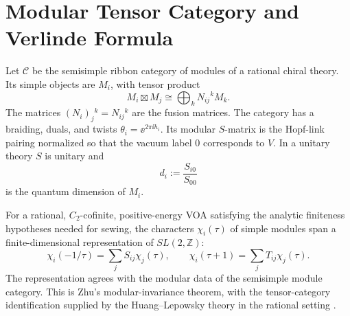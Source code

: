 \section{Modular Tensor Category and Verlinde Formula}

Let \(\mathcal C\) be the semisimple ribbon category of modules of a rational
chiral theory.  Its simple objects are \(M_i\), with tensor product
\[
  M_i\boxtimes M_j\cong \bigoplus_k N_{ij}{}^k M_k .
\]
The matrices \((N_i)_j{}^k=N_{ij}{}^k\) are the fusion matrices.  The category
has a braiding, duals, and twists \(\theta_i=\ee^{2\pi\ii h_i}\).  Its
modular \(S\)-matrix is the Hopf-link pairing normalized so that the vacuum
label \(0\) corresponds to \(V\).  In a unitary theory \(S\) is unitary and
\[
  d_i:=\frac{S_{i0}}{S_{00}}
\]
is the quantum dimension of \(M_i\).

\begin{quotedtheorem}
\label{qthm:voa-character-modularity}
For a rational, \(C_2\)-cofinite, positive-energy VOA satisfying the analytic
finiteness hypotheses needed for sewing, the characters
\(\chi_i(\tau)\) of simple modules span a finite-dimensional representation
of \(SL(2,\mathbb Z)\):
\[
  \chi_i(-1/\tau)=\sum_j S_{ij}\chi_j(\tau),
  \qquad
  \chi_i(\tau+1)=\sum_j T_{ij}\chi_j(\tau).
\]
The representation agrees with the modular data of the semisimple module
category.  This is Zhu's modular-invariance theorem, with the
tensor-category identification supplied by the Huang--Lepowsky theory in the
rational setting \cite{Zhu1996,Huang2005}.
\end{quotedtheorem}

